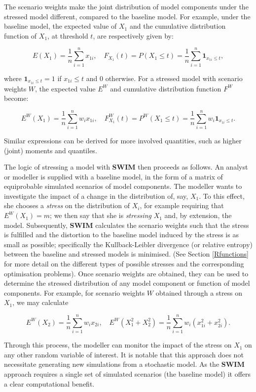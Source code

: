 \documentclass[
]{article}
\begin{document}
The scenario weights make the joint distribution of model components under the stressed model different, compared to the baseline model. For example, under the baseline model, the expected value of \(X_1\) and the cumulative distribution function of \(X_1\), at threshold \(t\), are respectively given by:

\[
E(X_1)=\frac 1  n \sum_{i=1}^nx_{1i},\quad F_{X_1}(t)= P(X_1\leq t)=\frac 1 n \sum_{i=1}^n \mathbf 1 _{x_{1i}\leq t},
\]

where \(\mathbf 1 _{x_{1i}\leq t}=1\) if \(x_{1i}\leq t\) and \(0\) otherwise. For a stressed model with scenario weights \(W\), the expected value \(E^W\) and cumulative distribution function \(F^W\) become:

\[
E^W(X_1)=\frac 1  n \sum_{i=1}^n w_i x_{1i},\quad F_{X_1}^W(t)=P^W(X_1\leq t)=\frac 1 n \sum_{i=1}^n w_i \mathbf 1 _{x_{1i}\leq t}.
\]

Similar expressions can be derived for more involved quantities, such as higher (joint) moments and quantiles.

The logic of stressing a model with \textbf{SWIM} then proceeds as follows. An analyst or modeller is supplied with a baseline model, in the form of a matrix of equiprobable simulated scenarios of model components. The modeller wants to investigate the impact of a change in the distribution of, say, \(X_1\). To this effect, she chooses a \emph{stress} on the distribution of \(X_i\), for example requiring that \(E^W(X_1)=m\); we then say that she is \emph{stressing} \(X_1\) and, by extension, the model. Subsequently, \textbf{SWIM} calculates the scenario weights such that the stress is fulfilled and the distortion to the baseline model induced by the stress is as small as possible; specifically the Kullback-Leibler divergence (or relative entropy) between the baseline and stressed models is minimised. (See Section \ref{Rfunctions} for more detail on the different types of possible stresses and the corresponding optimisation problems). Once scenario weights are obtained, they can be used to determine the stressed distribution of any model component or function of model components. For example, for scenario weights \(W\) obtained through a stress on \(X_1\), we may calculate

\[
E^W(X_2)=\frac 1  n\sum_{i=1}^n w_i x_{2i},\quad E^W(X_1^2+X_2^2)=\frac 1  n \sum_{i=1}^n w_i \left(x_{1i}^2+ x_{2i}^2 \right).
\]

Through this process, the modeller can monitor the impact of the stress on \(X_1\) on any other random variable of interest. It is notable that this approach does not necessitate generating new simulations from a stochastic model. As the \textbf{SWIM} approach requires a single set of simulated scenarios (the baseline model) it offers a clear computational benefit.
\end{document}
